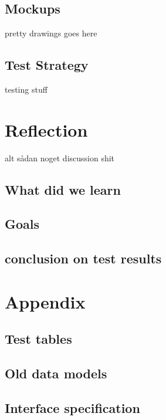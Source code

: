 \documentclass[10pt,a4paper]{article}
\begin{document}
\subsection{Mockups}
pretty drawings goes here
\subsection{Test Strategy}
testing stuff
\section{Reflection}
alt sådan noget discussion shit
\subsection{What did we learn}
\subsection{Goals}
\subsection{conclusion on test results}
\section{Appendix}
\subsection{Test tables}
\subsection{Old data models}
\subsection{Interface specification}
\end{document}
